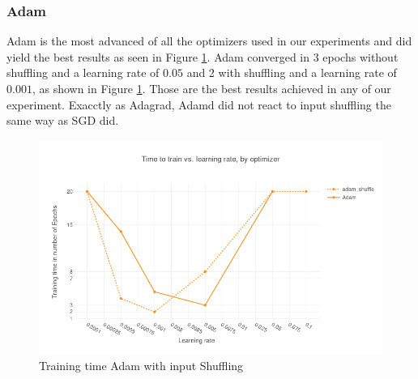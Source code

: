 \subsubsection{Adam}
Adam is the most advanced of all the optimizers used in our experiments and did yield the best results as seen in Figure \ref{fig:results_adam_shuffle}. Adam converged in 3 epochs without shuffling and a learning rate of $0.05$ and 2 with shuffling and a learning rate of $0.001$, as shown in Figure \ref{fig:results_adam_shuffle}. Those are the best results achieved in any of our experiment. Exacctly as Adagrad, Adamd did not react to input shuffling the same way as SGD did.
\begin{figure}[h]
    \centering
            \includegraphics[scale=0.3]{images/results_adam_shuffle} 
    \caption{Training time Adam with input Shuffling}
    \label{fig:results_adam_shuffle}
\end{figure}